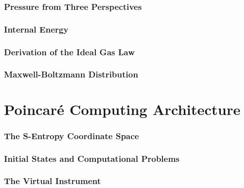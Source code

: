 \documentclass[twocolumn,10pt]{article}
\theoremstyle{plain}
\theoremstyle{definition}
\theoremstyle{remark}
\begin{document}
\section{Pressure from Three Perspectives}
\label{sec:pressure}



\section{Internal Energy}
\label{sec:internal_energy}



\section{Derivation of the Ideal Gas Law}
\label{sec:ideal_gas_law}



\section{Maxwell-Boltzmann Distribution}
\label{sec:maxwell}




\part{Poincar\'e Computing Architecture}
\label{part:computing}

\section{The S-Entropy Coordinate Space}
\label{sec:finite_space}



\section{Initial States and Computational Problems}
\label{sec:initial_state}



\section{The Virtual Instrument}
\label{sec:virtual_instrument}
\end{document}
